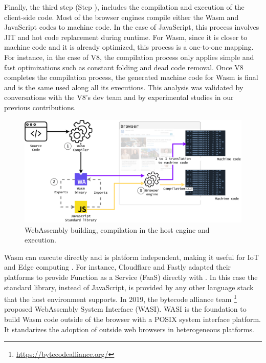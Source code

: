 Finally, the third step (Step ), includes the compilation and execution of the client-side code. Most of the browser engines compile either the Wasm and JavaScript codes to machine code. In the case of JavaScript, this process involves JIT and hot code replacement during runtime. For Wasm, since it is closer to machine code and it is already optimized, this process is a one-to-one mapping. For instance, in the case of V8, the compilation process only applies simple and fast optimizations such as constant folding and dead code removal. Once V8 completes the compilation process, the generated machine code for Wasm is final and is the same used along all its executions. This analysis was validated by conversations with the V8's dev team and by experimental studies in our previous contributions.  

\begin{figure}[h]
    \centering
    \includegraphics[width=\linewidth]{diagrams/wasm_workflow.pdf}
    \caption{WebAssembly building, compilation in the host engine and execution. }
    \label{diagrams:sota:wasm}
\end{figure}

Wasm can execute directly and is platform independent, making it useful for IoT and Edge computing \cite{Narayan2021Swivel,Sledge}. For instance, Cloudflare and Fastly adapted their platforms to provide Function as a Service (FaaS) directly with \wasm. In this case the standard library, instead of JavaScript, is provided by any other language stack that the host environment supports.
In 2019, the bytecode alliance team \footnote{\url{https://bytecodealliance.org/}} proposed WebAssembly System Interface (WASI). WASI is the foundation to build Wasm code outside of the browser with a POSIX system interface platform. It standarizes the adoption of \wasm outside web browsers \cite{bryant2020webassembly} in heterogeneous platforms. 


